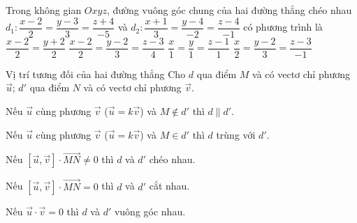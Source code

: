 \begin{ex}%
	Trong không gian $Oxyz$, đường vuông góc chung của hai đường thẳng chéo nhau $d_1\colon \dfrac{x-2}{2}=\dfrac{y-3}{3}=\dfrac{z+4}{-5}$ và $d_2\colon \dfrac{x+1}{3}=\dfrac{y-4}{-2}=\dfrac{z-4}{-1}$ có phương trình là
	\choice
	{$\dfrac{x-2}{2}=\dfrac{y+2}{2}$}
	{$\dfrac{x-2}{2}=\dfrac{y-2}{3}=\dfrac{z-3}{4}$}
	{\True $\dfrac{x}{1}=\dfrac{y}{1}=\dfrac{z-1}{1}$}
	{$\dfrac{x}{2}=\dfrac{y-2}{3}=\dfrac{z-3}{-1}$}
\end{ex}
\begin{dang}{Vị trí tương đối của hai đường thẳng}
	Cho $d$ qua điểm $M$ và có vectơ chỉ phương $\vec{u}$; $d'$ qua điểm $N$ và có vectơ chỉ phương $\vec{v}$.
	\begin{listEX}[1]
		\item [\ding{172}] Nếu $\vec{u}$ cùng phương $\vec{v}$ ($\vec{u}=k\vec{v}$) và $M \notin d'$ thì $d \parallel d'$.
		\item [\ding{173}] Nếu $\vec{u}$ cùng phương $\vec{v}$ ($\vec{u}=k\vec{v}$) và $M \in d'$ thì $d$ trùng với $d'$.
		\item [\ding{174}] Nếu $\left[\vec{u},\vec{v}\right] \cdot \vec{MN} \ne 0$ thì $d$ và $d'$ chéo nhau.
		\item [\ding{175}] Nếu $\left[\vec{u},\vec{v}\right] \cdot \vec{MN} = 0$ thì $d$ và $d'$ cắt nhau.
		\item [\ding{176}] Nếu $\vec{u} \cdot \vec{v} =0$ thì $d$ và $d'$ vuông góc nhau.
	\end{listEX}
\end{dang}
